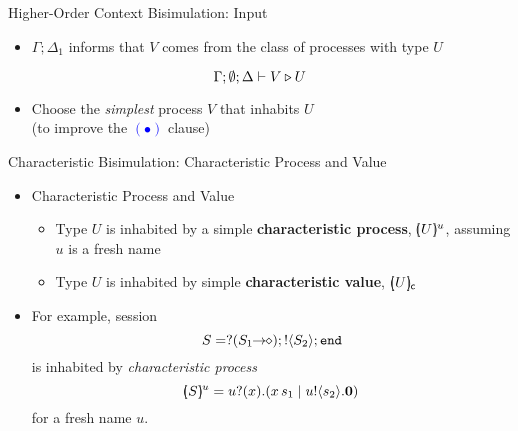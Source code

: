 \documentclass{beamer}
\begin{document}
	\begin{frame}{Higher-Order Context Bisimulation: Input}
		\begin{itemize}
			\item	$\Gamma; \Delta_1$ informs that $V$ comes from the class of processes with type $U$
		\end{itemize}
		\[
			\Gamma; \emptyset; \Delta \vdash V \triangleright U
		\]
		\begin{itemize}
			\item	Choose the {\em simplest} process $V$ that inhabits $U$\\
				(to improve the \textcolor{blue}{$(\bullet)$} clause)
		\end{itemize}
	\end{frame}

	\begin{frame}{Characteristic Bisimulation: Characteristic Process and Value}


		\begin{itemize}
			\item	Characteristic Process and Value
				\begin{itemize}
					\item	Type $U$ is inhabited by a simple
						{\bf characteristic process}, $[\!\!(U)\!\!]^{u}$,
						assuming $u$ is a fresh name

					\item	Type $U$ is inhabited by simple
						{\bf characteristic value}, $[\!\!(U)\!\!]_{\mathsf{c}}$
				\end{itemize}

			\item	For example, session
				\[
					S = ? (S_1\!\! \rightarrow\!\! \diamond) ; ! \langle S_2 \rangle ; \mathtt{end}
				\]
				is inhabited by {\em characteristic process}
				\[
					[\!\!(S)\!\!]^{u} = u ? (x) . (x\, {s_1} \;|\; u ! \langle s_2 \rangle . \mathbf{0})
				\]
				for a fresh name $u$.
		\end{itemize}
%
	\end{frame}
\end{document}

